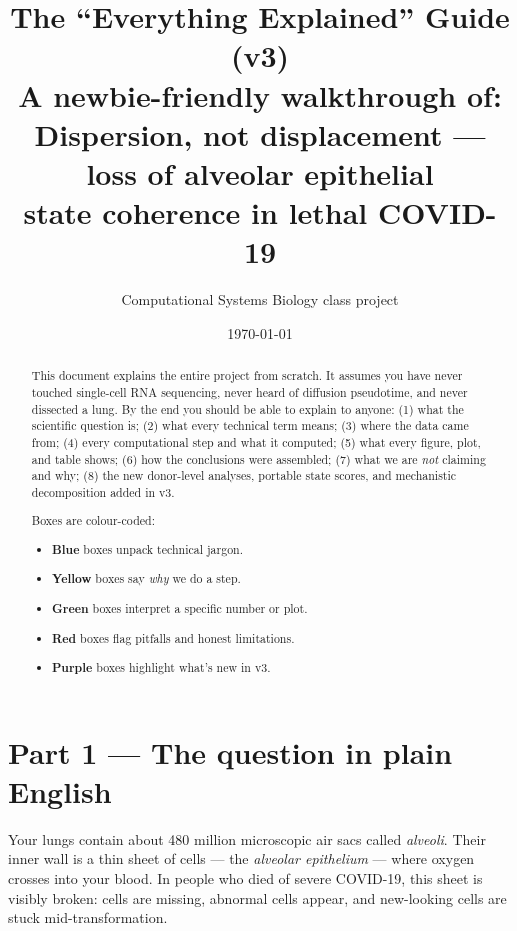 \documentclass[11pt]{article}
\title{The ``Everything Explained'' Guide (v3)\\
\large{A newbie-friendly walkthrough of:\\
Dispersion, not displacement --- loss of alveolar epithelial\\
state coherence in lethal COVID-19}}
\author{Computational Systems Biology class project}
\date{\today}
\begin{document}
\maketitle

\begin{abstract}
\noindent This document explains the entire project from scratch. It assumes you have never touched single-cell RNA sequencing, never heard of diffusion pseudotime, and never dissected a lung. By the end you should be able to explain to anyone: (1) what the scientific question is; (2) what every technical term means; (3) where the data came from; (4) every computational step and what it computed; (5) what every figure, plot, and table shows; (6) how the conclusions were assembled; (7) what we are \emph{not} claiming and why; (8) the new donor-level analyses, portable state scores, and mechanistic decomposition added in v3.

Boxes are colour-coded:
\begin{itemize}
\item \textcolor{blue!55!black}{\textbf{Blue}} boxes unpack technical jargon.
\item \textcolor{orange!60!black}{\textbf{Yellow}} boxes say \emph{why} we do a step.
\item \textcolor{green!45!black}{\textbf{Green}} boxes interpret a specific number or plot.
\item \textcolor{red!60!black}{\textbf{Red}} boxes flag pitfalls and honest limitations.
\item \textcolor{purple!55!black}{\textbf{Purple}} boxes highlight what's new in v3.
\end{itemize}
\end{abstract}

\tableofcontents
\clearpage

\section{Part 1 --- The question in plain English}

Your lungs contain about 480 million microscopic air sacs called \emph{alveoli}. Their inner wall is a thin sheet of cells --- the \emph{alveolar epithelium} --- where oxygen crosses into your blood. In people who died of severe COVID-19, this sheet is visibly broken: cells are missing, abnormal cells appear, and new-looking cells are stuck mid-transformation.
\end{document}
